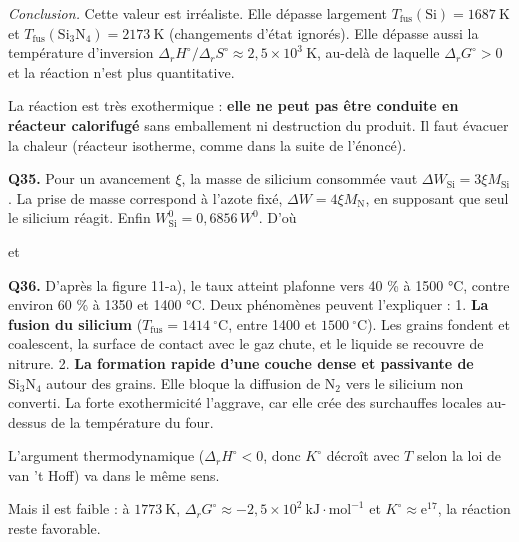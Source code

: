 \documentclass[11pt,a4paper]{article}
\newcommand{\equationajustee}[1]{%
  \sbox{\boiteequation}{$\displaystyle #1$}%
  \ifdim\wd\boiteequation>\linewidth
    \[\resizebox{\linewidth}{!}{\usebox{\boiteequation}}\]%
  \else
    \[#1\]%
  \fi}
\begin{document}
\emph{Conclusion.} Cette valeur est irréaliste. Elle dépasse largement \(T_{\mathrm{fus}}(\mathrm{Si})=1687\ \mathrm{K}\) et \(T_{\mathrm{fus}}(\mathrm{Si_3N_4})=2173\ \mathrm{K}\) (changements d'état ignorés). Elle dépasse aussi la température d'inversion \(\Delta_rH^\circ/\Delta_rS^\circ\approx2{,}5\times10^3\ \mathrm{K}\), au-delà de laquelle \(\Delta_rG^\circ>0\) et la réaction n'est plus quantitative.

La réaction est très exothermique : \textbf{elle ne peut pas être conduite en réacteur calorifugé} sans emballement ni destruction du produit. Il faut évacuer la chaleur (réacteur isotherme, comme dans la suite de l'énoncé).

\textbf{Q35.} Pour un avancement \(\xi\), la masse de silicium consommée vaut \(\Delta W_{\mathrm{Si}}=3\xi M_{\mathrm{Si}}\). La prise de masse correspond à l'azote fixé, \(\Delta W=4\xi M_{\mathrm{N}}\), en supposant que seul le silicium réagit. Enfin \(W^0_{\mathrm{Si}}=0{,}6856\,W^0\). D'où

\equationajustee{\alpha=\frac{3M_{\mathrm{Si}}}{4M_{\mathrm{N}}\times0{,}6856}\,\frac{\Delta W}{W^0}}

et

\equationajustee{\begin{aligned}
\beta&=\frac{3\times28{,}1}{4\times14{,}0\times0{,}6856}\\
&=\boxed{2{,}20}
\end{aligned}}

\textbf{Q36.} D'après la figure 11-a), le taux atteint plafonne vers 40 \% à 1500 °C, contre environ 60 \% à 1350 et 1400 °C. Deux phénomènes peuvent l'expliquer :
1. \textbf{La fusion du silicium} (\(T_{\mathrm{fus}}=1414\ ^\circ\mathrm{C}\), entre 1400 et \(1500\ ^\circ\mathrm{C}\)). Les grains fondent et coalescent, la surface de contact avec le gaz chute, et le liquide se recouvre de nitrure.
2. \textbf{La formation rapide d'une couche dense et passivante de \(\mathrm{Si_3N_4}\)} autour des grains. Elle bloque la diffusion de \(\mathrm{N_2}\) vers le silicium non converti. La forte exothermicité l'aggrave, car elle crée des surchauffes locales au-dessus de la température du four.

L'argument thermodynamique (\(\Delta_rH^\circ<0\), donc \(K^\circ\) décroît avec \(T\) selon la loi de van 't Hoff) va dans le même sens.

Mais il est faible : à \(1773\ \mathrm{K}\), \(\Delta_rG^\circ\approx-2{,}5\times10^2\ \mathrm{kJ\cdot mol^{-1}}\) et \(K^\circ\approx{\mathrm{e}}^{17}\), la réaction reste favorable.
\end{document}
